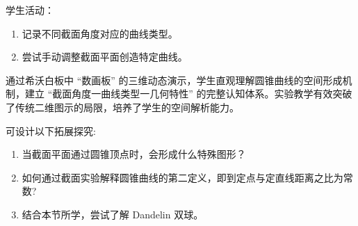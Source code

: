 \begin{description}
\begin{enumerate}[label=(\zhnum*)]
        \hspace*{2em}学生活动：
        \begin{enumerate}
            \item 记录不同截面角度对应的曲线类型。
            \item 尝试手动调整截面平面创造特定曲线。
        \end{enumerate}
    \end{enumerate}
  \item[结论] \hspace*{2em} 通过希沃白板中 “数画板” 的三维动态演示，学生直观理解圆锥曲线的空间形成机制，建立 “截面角度一曲线类型一几何特性” 的完整认知体系。实验教学有效突破了传统二维图示的局限，培养了学生的空间解析能力。
  \item[分析]
  \hspace*{2em} 可设计以下拓展探究:
  \begin{enumerate}
    \item 当截面平面通过圆锥顶点时，会形成什么特殊图形？
    \item 如何通过截面实验解释圆锥曲线的第二定义，即到定点与定直线距离之比为常数?
    \item 结合本节所学，尝试了解 Dandelin 双球。
  \end{enumerate}
\end{description}